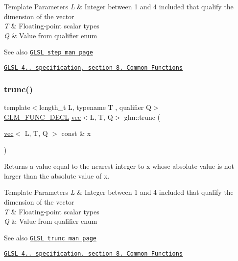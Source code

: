 \begin{DoxyTemplParams}{Template Parameters}
{\em L} & Integer between 1 and 4 included that qualify the dimension of the vector \\
\hline
{\em T} & Floating-\/point scalar types \\
\hline
{\em Q} & Value from qualifier enum\\
\hline
\end{DoxyTemplParams}
\begin{DoxySeeAlso}{See also}
\href{http://www.opengl.org/sdk/docs/manglsl/xhtml/step.xml}{\tt G\+L\+SL step man page} 

\href{http://www.opengl.org/registry/doc/GLSLangSpec.4.20.8.pdf}{\tt G\+L\+SL 4.. specification, section 8. Common Functions} 
\end{DoxySeeAlso}
\mbox{\label{group__core__func__common_gaf9375e3e06173271d49e6ffa3a334259}} 
\subsubsection{\texorpdfstring{trunc()}{trunc()}}
{\footnotesize\ttfamily template$<$length\+\_\+t L, typename T , qualifier Q$>$ \\
\hyperlink{setup_8hpp_ab2d052de21a70539923e9bcbf6e83a51}{G\+L\+M\+\_\+\+F\+U\+N\+C\+\_\+\+D\+E\+CL} \hyperlink{structglm_1_1vec}{vec}$<$L, T, Q$>$ glm\+::trunc (\begin{DoxyParamCaption}\item[{\hyperlink{structglm_1_1vec}{vec}$<$ L, T, Q $>$ const \&}]{x }\end{DoxyParamCaption})}

Returns a value equal to the nearest integer to x whose absolute value is not larger than the absolute value of x.


\begin{DoxyTemplParams}{Template Parameters}
{\em L} & Integer between 1 and 4 included that qualify the dimension of the vector \\
\hline
{\em T} & Floating-\/point scalar types \\
\hline
{\em Q} & Value from qualifier enum\\
\hline
\end{DoxyTemplParams}
\begin{DoxySeeAlso}{See also}
\href{http://www.opengl.org/sdk/docs/manglsl/xhtml/trunc.xml}{\tt G\+L\+SL trunc man page} 

\href{http://www.opengl.org/registry/doc/GLSLangSpec.4.20.8.pdf}{\tt G\+L\+SL 4.. specification, section 8. Common Functions} 
\end{DoxySeeAlso}
\mbox{\label{group__core__func__common_ga97464ca9ff4267de30ea408f700d4ca8}} 
